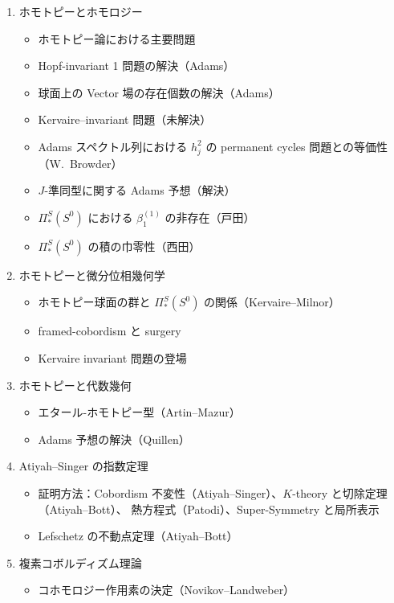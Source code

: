 \documentclass[uplatex,dvipdfmx]{jlreq}
\begin{document}
\begin{enumerate}
  \item ホモトピーとホモロジー
        \begin{itemize}
          \item ホモトピー論における主要問題
          \item Hopf-invariant 1 問題の解決（Adams）
          \item 球面上の Vector 場の存在個数の解決（Adams）
          \item Kervaire--invariant 問題（未解決）
          \item Adams スペクトル列における $h_j^2$ の permanent cycles 問題との等価性（W.~Browder）
          \item $J$-準同型に関する Adams 予想（解決）
          \item $\Pi_*^S(S^0)$ における $\beta_1^{(1)}$ の非存在（戸田）
          \item $\Pi_*^S(S^0)$ の積の巾零性（西田）
        \end{itemize}
  \item ホモトピーと微分位相幾何学
        \begin{itemize}
          \item ホモトピー球面の群と $\Pi_*^S(S^0)$ の関係（Kervaire--Milnor）
          \item framed-cobordism と surgery
          \item Kervaire invariant 問題の登場
        \end{itemize}
  \item ホモトピーと代数幾何
        \begin{itemize}
          \item エタール-ホモトピー型（Artin--Mazur）
          \item Adams 予想の解決（Quillen）
        \end{itemize}
  \item Atiyah--Singer の指数定理
        \begin{itemize}
          \item 証明方法：Cobordism 不変性（Atiyah--Singer）、$K$-theory と切除定理（Atiyah--Bott）、
                熱方程式（Patodi）、Super-Symmetry と局所表示
          \item Lefschetz の不動点定理（Atiyah--Bott）
        \end{itemize}
  \item 複素コボルディズム理論
        \begin{itemize}
          \item コホモロジー作用素の決定（Novikov--Landweber）

\end{itemize}
\end{enumerate}
\end{document}
